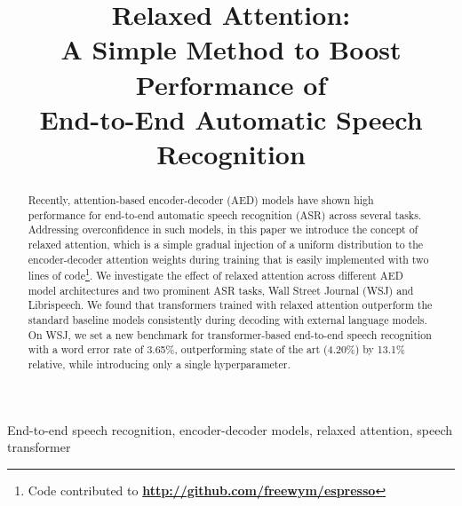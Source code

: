\documentclass{article}
\title{Relaxed Attention: \\ A Simple Method to Boost Performance of \\ End-to-End Automatic Speech Recognition}
\begin{document}
\maketitle


\begin{abstract}\vspace{-1mm}
Recently, attention-based encoder-decoder (AED) models have shown high performance for end-to-end automatic speech recognition (ASR) across several tasks. Addressing overconfidence in such models, in this paper we introduce the concept of relaxed attention, which is a simple gradual injection of a uniform distribution to the encoder-decoder attention weights during training that is easily implemented with two lines of code\footnote{Code contributed to \bf\url{http://github.com/freewym/espresso}}. We investigate the effect of relaxed attention across different AED model architectures and two prominent ASR tasks, Wall Street Journal (WSJ) and Librispeech. We found that transformers trained with relaxed attention outperform the standard baseline models consistently during decoding with external language models. On WSJ, we set a new benchmark for transformer-based end-to-end speech recognition with a word error rate of 3.65\%, outperforming state of the art (4.20\%) by 13.1\% relative, while introducing only a single hyperparameter. 
\end{abstract} 
\vspace{-2mm}
\begin{keywords}
End-to-end speech recognition, encoder-decoder models, relaxed attention, speech transformer
\end{keywords}




	\vspace{-2mm}
\end{document}
